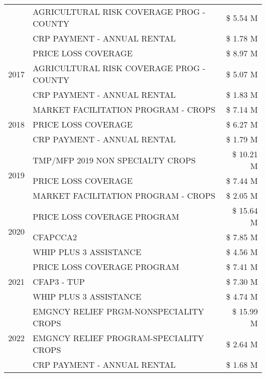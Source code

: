 \begin{tabular}{llr}
 & AGRICULTURAL RISK COVERAGE PROG - COUNTY & \$ 5.54 M \\
 & CRP PAYMENT - ANNUAL RENTAL & \$ 1.78 M \\
\cline{1-3}
\multirow[t]{3}{*}{2017} & PRICE LOSS COVERAGE & \$ 8.97 M \\
 & AGRICULTURAL RISK COVERAGE PROG - COUNTY & \$ 5.07 M \\
 & CRP PAYMENT - ANNUAL RENTAL & \$ 1.83 M \\
\cline{1-3}
\multirow[t]{3}{*}{2018} & MARKET FACILITATION PROGRAM - CROPS & \$ 7.14 M \\
 & PRICE LOSS COVERAGE & \$ 6.27 M \\
 & CRP PAYMENT - ANNUAL RENTAL & \$ 1.79 M \\
\cline{1-3}
\multirow[t]{3}{*}{2019} & TMP/MFP 2019 NON SPECIALTY CROPS & \$ 10.21 M \\
 & PRICE LOSS COVERAGE & \$ 7.44 M \\
 & MARKET FACILITATION PROGRAM - CROPS & \$ 2.05 M \\
\cline{1-3}
\multirow[t]{3}{*}{2020} & PRICE LOSS COVERAGE PROGRAM & \$ 15.64 M \\
 & CFAPCCA2 & \$ 7.85 M \\
 & WHIP PLUS 3 ASSISTANCE & \$ 4.56 M \\
\cline{1-3}
\multirow[t]{3}{*}{2021} & PRICE LOSS COVERAGE PROGRAM & \$ 7.41 M \\
 & CFAP3 - TUP & \$ 7.30 M \\
 & WHIP PLUS 3 ASSISTANCE & \$ 4.74 M \\
\cline{1-3}
\multirow[t]{3}{*}{2022} & EMGNCY RELIEF PRGM-NONSPECIALITY CROPS & \$ 15.99 M \\
 & EMGNCY RELIEF PROGRAM-SPECIALITY CROPS & \$ 2.64 M \\
 & CRP PAYMENT - ANNUAL RENTAL & \$ 1.68 M \\
\cline{1-3}
\bottomrule
\end{tabular}
